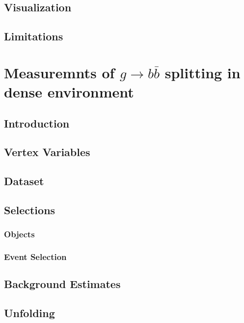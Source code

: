 \documentclass{report}
\begin{document}
\section{Visualization}


\section{Limitations}


\chapter{Measuremnts of $g\rightarrow b\bar{b}$ splitting in dense environment}
\label{chap:gbb}
\section{Introduction}


\section{Vertex Variables}


\section{Dataset}


\section{Selections}
\subsection{Objects}

\subsection{Event Selection}


\section{Background Estimates}



\section{Unfolding}

\end{document}

